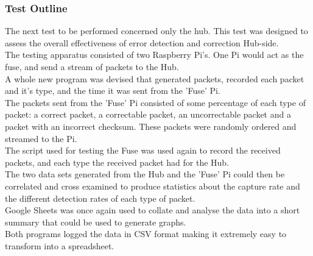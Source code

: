 \documentclass[preprint,12pt,3p]{elsarticle}
\begin{document}
\subsubsection{Test Outline}
The next test to be performed concerned only the hub. This test was designed to assess the overall effectiveness of error detection and correction Hub-side.\\
The testing apparatus consisted of two Raspberry Pi's. One Pi would act as the fuse, and send a stream of packets to the Hub.\\ 
A whole new program was devised that generated packets, recorded each packet and it's type, and the time it was sent from the 'Fuse' Pi.\\
The packets sent from the 'Fuse' Pi consisted of some percentage of each type of packet: a correct packet, a correctable packet, an uncorrectable packet and a packet with an incorrect checksum. These packets were randomly ordered and streamed to the Pi.\\
The script used for testing the Fuse was used again to record the received packets, and each type the received packet had for the Hub.\\
The two data sets generated from the Hub and the 'Fuse' Pi could then be correlated and cross examined to produce statistics about the capture rate and the different detection rates of each type of packet.\\
Google Sheets was once again used to collate and analyse the data into a short summary that could be used to generate graphs.\\
Both programs logged the data in CSV format making it extremely easy to transform into a spreadsheet.
\end{document}
